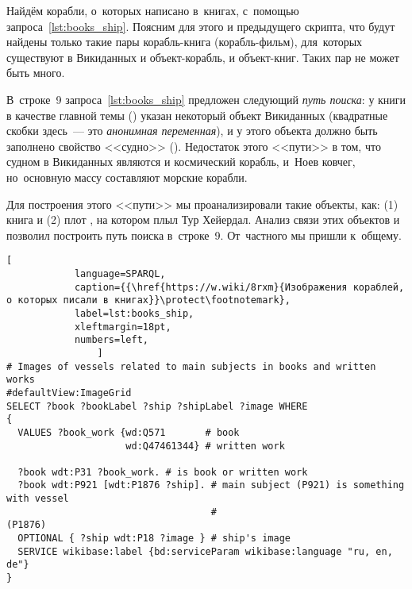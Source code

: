 \begin{task}
Найдём корабли, о~которых написано в~книгах, с~помощью запроса~\ref{lst:books_ship}. 
    Поясним для этого и предыдущего скрипта, 
    что будут найдены только такие пары корабль-книга (корабль-фильм), 
    для~которых существуют в Викиданных и объект-корабль, и объект-книг. Таких пар не может быть много. 


    В~строке~9 запроса~\ref{lst:books_ship} предложен следующий \emph{путь поиска}: 
    у книги в качестве главной темы () 
    указан некоторый объект Викиданных (квадратные скобки здесь~--- это \emph{анонимная переменная}), 
    и у этого объекта должно быть заполнено свойство <<судно>> (). 
    Недостаток этого <<пути>> в том, что судном в Викиданных являются и космический корабль, и~Ноев ковчег, 
    но~основную массу составляют морские корабли. 

    Для построения этого <<пути>> мы проанализировали такие объекты, как: 
    (1) книга  
    и (2) плот , на котором плыл Тур Хейердал. 
    Анализ связи этих объектов и позволил построить путь поиска в~строке~9. 
    От~частного мы пришли к~общему. 

\begin{lstlisting}[ 
            language=SPARQL, 
            caption={{\href{https://w.wiki/8rxm}{Изображения кораблей, о которых писали в книгах}}\protect\footnotemark}, 
            label=lst:books_ship, 
            xleftmargin=18pt, 
            numbers=left,
                ]
# Images of vessels related to main subjects in books and written works
#defaultView:ImageGrid
SELECT ?book ?bookLabel ?ship ?shipLabel ?image WHERE
{
  VALUES ?book_work {wd:Q571       # book
                     wd:Q47461344} # written work
  
  ?book wdt:P31 ?book_work. # is book or written work  
  ?book wdt:P921 [wdt:P1876 ?ship]. # main subject (P921) is something with vessel 
                                    #                                      (P1876)
  OPTIONAL { ?ship wdt:P18 ?image } # ship's image
  SERVICE wikibase:label {bd:serviceParam wikibase:language "ru, en, de"}
}
\end{lstlisting}
\end{task}






